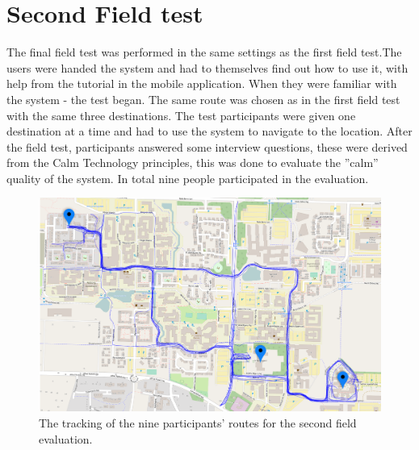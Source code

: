 \documentclass{sigchi}
\begin{document}
\section{Second Field test}
The final field test was performed in the same settings as the first field test.The users were handed the system and had to themselves find out how to use it, with help from the tutorial in the mobile application. When they were familiar with the system - the test began. The same route was chosen as in the first field test with the same three destinations. 
\newline
\newline
The test participants were given one destination at a time and had to use the system to navigate to the location. After the field test, participants answered some interview questions, these were derived from the Calm Technology principles, this was done to evaluate the ''calm'' quality of the system. In total nine people participated in the evaluation.
\begin{figure}[!b]
  \centering
  \includegraphics[width=1.02\columnwidth]{figures/stort_heat_map.png}
  \caption{The tracking of the nine participants' routes for the second field evaluation.}
  \label{fig:stort_heat_map}
\end{figure}
\end{document}
